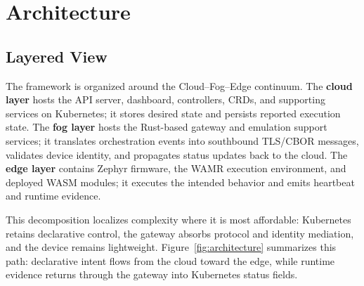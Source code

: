 \section{Architecture}\label{sec:architecture}

\subsection{Layered View}
The framework is organized around the Cloud--Fog--Edge continuum. The \textbf{cloud layer} hosts the API server, dashboard, controllers, CRDs, and supporting services on Kubernetes; it stores desired state and persists reported execution state. The \textbf{fog layer} hosts the Rust-based gateway and emulation support services; it translates orchestration events into southbound TLS/CBOR messages, validates device identity, and propagates status updates back to the cloud. The \textbf{edge layer} contains Zephyr firmware, the WAMR execution environment, and deployed WASM modules; it executes the intended behavior and emits heartbeat and runtime evidence.

This decomposition localizes complexity where it is most affordable: Kubernetes retains declarative control, the gateway absorbs protocol and identity mediation, and the device remains lightweight. Figure~\ref{fig:architecture} summarizes this path: declarative intent flows from the cloud toward the edge, while runtime evidence returns through the gateway into Kubernetes status fields.

